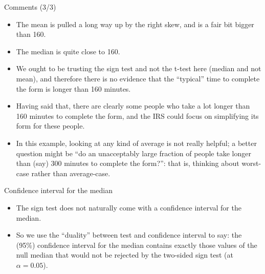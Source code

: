 \documentclass[ignorenonframetext,]{beamer}
\providecommand{\tightlist}{%
  \setlength{\itemsep}{0pt}\setlength{\parskip}{0pt}}
\begin{document}
\begin{frame}{Comments (3/3)}
\protect\hypertarget{comments-33}{}

\begin{itemize}
\tightlist
\item
  The mean is pulled a long way up by the right skew, and is a fair bit
  bigger than 160.
\item
  The median is quite close to 160.
\item
  We ought to be trusting the sign test and not the t-test here (median
  and not mean), and therefore there is no evidence that the ``typical''
  time to complete the form is longer than 160 minutes.
\item
  Having said that, there are clearly some people who take a lot longer
  than 160 minutes to complete the form, and the IRS could focus on
  simplifying its form for these people.
\item
  In this example, looking at any kind of average is not really helpful;
  a better question might be ``do an unacceptably large fraction of
  people take longer than (say) 300 minutes to complete the form?'':
  that is, thinking about worst-case rather than average-case.
\end{itemize}

\end{frame}

\begin{frame}{Confidence interval for the median}
\protect\hypertarget{confidence-interval-for-the-median}{}

\begin{itemize}
\tightlist
\item
  The sign test does not naturally come with a confidence interval for
  the median.
\item
  So we use the ``duality'' between test and confidence interval to say:
  the (95\%) confidence interval for the median contains exactly those
  values of the null median that would not be rejected by the two-sided
  sign test (at \(\alpha = 0.05\)).
\end{itemize}

\end{frame}
\end{document}
